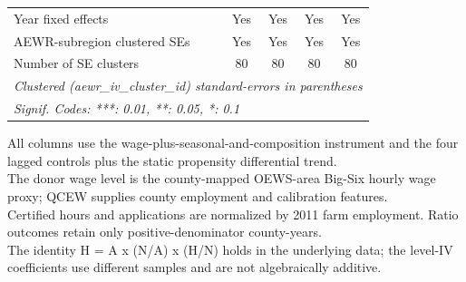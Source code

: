 \begin{table}[htbp]
\begin{tabular}{lcccc}
      Year fixed effects                   & Yes             & Yes           & Yes                   & Yes\\
      AEWR-subregion clustered SEs         & Yes             & Yes           & Yes                   & Yes\\
      Number of SE clusters                & 80              & 80            & 80                    & 80\\
      \midrule \midrule
      \multicolumn{5}{l}{\emph{Clustered (aewr\_iv\_cluster\_id) standard-errors in parentheses}}\\
      \multicolumn{5}{l}{\emph{Signif. Codes: ***: 0.01, **: 0.05, *: 0.1}}\\
   \end{tabular}

   \par \raggedright
   All columns use the wage-plus-seasonal-and-composition instrument and the four lagged controls plus the static propensity differential trend.\\
   The donor wage level is the county-mapped OEWS-area Big-Six hourly wage proxy; QCEW supplies county employment and calibration features.\\
   Certified hours and applications are normalized by 2011 farm employment. Ratio outcomes retain only positive-denominator county-years.\\
   The identity H = A x (N/A) x (H/N) holds in the underlying data; the level-IV coefficients use different samples and are not algebraically additive.
\end{table}


